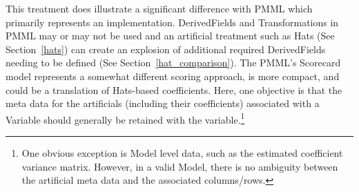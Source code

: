 \documentclass[10pt]{article}
\begin{document}
            This treatment does illustrate a significant difference with PMML which primarily represents an implementation.  DerivedFields
            and Transformations in PMML may or may not be used and an artificial treatment such as Hats (See Section~\ref{hats}) can create
            an explosion of additional required DerivedFields needing to be defined (See Section~\ref{hat_comparison}).  The PMML's
            Scorecard model represents a somewhat different scoring approach, is more compact, and could be a translation of Hats-based
            coefficients.  Here, one objective is that the meta data for the artificials (including their coefficients) associated with a
            Variable should generally be retained with the variable.\footnote{One obvious exception is Model level data, such as the
            estimated coefficient variance matrix.  However, in a valid Model, there is no ambiguity between the artificial meta data and
            the associated columns/rows.}
\end{document}

